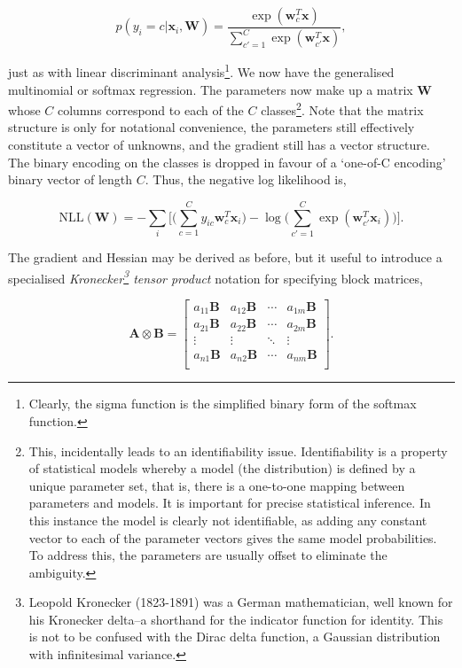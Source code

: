 \documentclass[11pt]{amsart}
\begin{document}
$$p(y_i = c | \mathbf{x}_i, \mathbf{W}) = \frac{\exp(\mathbf{w}_c^T\mathbf{x})}{\sum_{c' = 1}^C \exp(\mathbf{w}_{c'}^T\mathbf{x})},$$

just as with linear discriminant analysis\footnote{Clearly, the sigma function is the simplified binary form of the softmax function.}. We now have the generalised multinomial or softmax regression. The parameters now make up a matrix $\mathbf{W}$ whose $C$ columns correspond to each of the $C$ classes\footnote{This, incidentally leads to an identifiability issue. Identifiability is a property of statistical models whereby a model (the distribution) is defined by a unique parameter set, that is, there is a one-to-one mapping between parameters and models. It is important for precise statistical inference. In this instance the model is clearly not identifiable, as adding any constant vector to each of the parameter vectors gives the same model probabilities. To address this, the parameters are usually offset to eliminate the ambiguity.}. Note that the matrix structure is only for notational convenience, the parameters still effectively constitute a vector of unknowns, and the gradient still has a vector structure. The binary encoding on the classes is dropped in favour of a `one-of-C encoding' binary vector of length $C$. Thus, the negative log likelihood is,

$$\text{NLL}(\mathbf{W}) = -\sum_i \bigg[\bigg(\sum_{c = 1}^Cy_{ic}\mathbf{w}_c^T\mathbf{x}_i\bigg) - \log\bigg(\sum_{c'=1}^C\exp(\mathbf{w}_{c'}^T\mathbf{x}_i)\bigg)\bigg].$$

The gradient and Hessian may be derived as before, but it useful to introduce a specialised \emph{Kronecker\footnote{Leopold Kronecker (1823-1891) was a German mathematician, well known for his Kronecker delta--a shorthand for the indicator function for identity. This is not to be confused with the Dirac delta function, a Gaussian distribution with infinitesimal variance.} tensor product} notation for specifying block matrices,

$$\mathbf{A} \otimes \mathbf{B} = \begin{bmatrix}
a_{11}\mathbf{B}&a_{12}\mathbf{B}&\cdots&a_{1m}\mathbf{B}\\
a_{21}\mathbf{B}&a_{22}\mathbf{B}&\cdots&a_{2m}\mathbf{B}\\
\vdots & \vdots & \ddots & \vdots \\
a_{n1}\mathbf{B}&a_{n2}\mathbf{B}&\cdots&a_{nm}\mathbf{B}\\
\end{bmatrix}.$$
\end{document}
